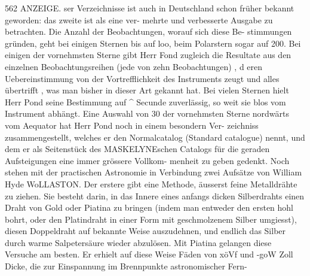 \documentclass[12pt,a4paper]{article}
\begin{document}
\newpage
562 ANZEIGE.\newline
ser Verzeichnisse ist auch in Deutschland schon früher bekannt geworden: das zweite ist als eine ver-\newline
mehrte und verbesserte Ausgabe zu betrachten. Die Anzahl der Beobachtungen, worauf sich diese Be-\newline
stimmungen gründen, geht bei einigen Sternen bis auf loo, beim Polarstern sogar auf 200. Bei einigen\newline
der vornehmsten Sterne gibt Herr Fond zugleich die Resultate aus den einzelnen Beobachtungsreihen\newline
(jede von zehn Beobachtungen) , d eren Uebereinstimmung von der Vortrefflichkeit des Instruments zeugt\newline
und alles übertrifft , was man bisher in dieser Art gekannt hat. Bei vielen Sternen hielt Herr Pond\newline
seine Bestimmung auf \^{} Secunde zuverlässig, so weit sie blos vom Instrument abhängt. Eine Auswahl\newline
von 30 der vornehmsten Sterne nordwärts vom Aequator hat Herr Pond noch in einem besondern Ver-\newline
zeichniss zusammengestellt, welches er den Normalcatalog (Standard catalogue) nennt, und dem er als\newline
Seitenstück des MASKELYNEschen Catalogs für die geraden Aufsteigungen eine immer grössere Vollkom-\newline
menheit zu geben gedenkt.\newline
Noch stehen mit der practischen Astronomie in Verbindung zwei Aufsätze von William Hyde\newline
WoLLASTON. Der erstere gibt eine Methode, äusserst feine Metalldrähte zu ziehen. Sie besteht darin,\newline
in das Innere eines anfangs dicken Silberdrahts einen Draht von Gold oder Piatina zu bringen (indem\newline
man entweder den ersten hohl bohrt, oder den Platindraht in einer Form mit geschmolzenem Silber\newline
umgiesst), diesen Doppeldraht auf bekannte Weise auszudehnen, und endlich das Silber durch warme\newline
Salpetersäure wieder abzulösen. Mit Piatina gelangen diese Versuche am besten. Er erhielt auf diese\newline
Weise Fäden von xöVf und -goW Zoll Dicke, die zur Einspannung im Brennpunkte astronomischer Fern-\newline
\end{document}
